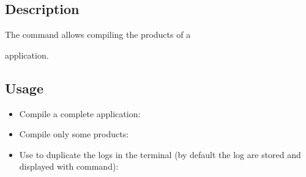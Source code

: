 \documentclass[a4paper,10pt,english]{sphinxmanual}
\begin{document}
\subsection{Description}
\label{\detokenize{commands/compile:description}}
The  command allows compiling the products of a %
\begin{footnote}[5]\sphinxAtStartFootnote
{}
%
\end{footnote} application.


\subsection{Usage}
\label{\detokenize{commands/compile:usage}}\begin{itemize}
\item {} 
Compile a complete application:

%
\begin{sphinxVerbatim}[commandchars=\\\{\}]
  
\end{sphinxVerbatim}

\item {} 
Compile only some products:

%
\begin{sphinxVerbatim}[commandchars=\\\{\}]
     
\end{sphinxVerbatim}

\item {} 
Use  to duplicate the logs in the terminal (by default the log are stored and displayed with  command):

%
\begin{sphinxVerbatim}[commandchars=\\\{\}]
     
\end{sphinxVerbatim}


\end{itemize}
\end{document}
